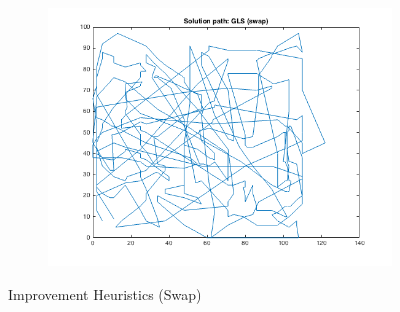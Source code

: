 \documentclass{paper}
\begin{document}
\begin{figure}[!h]
{    }
    \begin{subfigure}[]{\textwidth}
        \centering
        \includegraphics[width=0.7\linewidth]{GLS(swap)}
    \end{subfigure}
    \caption{Improvement Heuristics (Swap)}    
\label{fig:SwapPath}
\end{figure}
\end{document}
